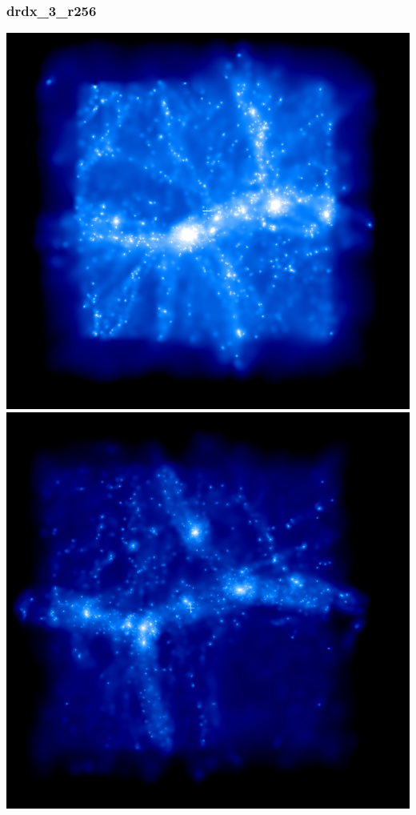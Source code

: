 \documentclass[a4paper,11pt,fleqn,oneside]{book}
\begin{document}
\newpage
\subsubsection{drdx\_3\_r256}

\includegraphics[scale=0.2]{drdx_3_r256/1.png} 
\includegraphics[scale=0.2]{drdx_3_r256/2.png} \\
\end{document}
